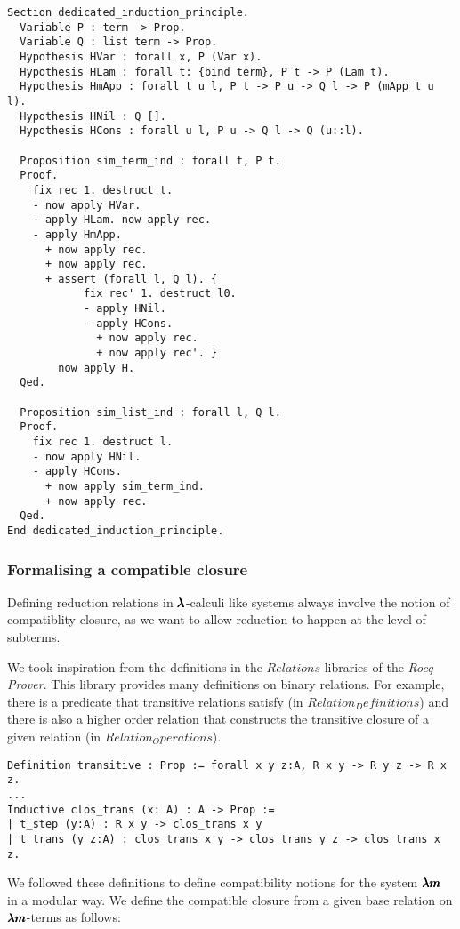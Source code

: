 \begin{lstlisting}[language=Coq]
Section dedicated_induction_principle.
  Variable P : term -> Prop.
  Variable Q : list term -> Prop.
  Hypothesis HVar : forall x, P (Var x).
  Hypothesis HLam : forall t: {bind term}, P t -> P (Lam t).
  Hypothesis HmApp : forall t u l, P t -> P u -> Q l -> P (mApp t u l).
  Hypothesis HNil : Q [].
  Hypothesis HCons : forall u l, P u -> Q l -> Q (u::l).
  
  Proposition sim_term_ind : forall t, P t.
  Proof.
    fix rec 1. destruct t.
    - now apply HVar.
    - apply HLam. now apply rec.
    - apply HmApp.
      + now apply rec.
      + now apply rec.
      + assert (forall l, Q l). {
            fix rec' 1. destruct l0.
            - apply HNil.
            - apply HCons.
              + now apply rec.
              + now apply rec'. }          
        now apply H.
  Qed.      
  
  Proposition sim_list_ind : forall l, Q l.
  Proof.
    fix rec 1. destruct l.
    - now apply HNil.
    - apply HCons.
      + now apply sim_term_ind.
      + now apply rec.
  Qed.          
End dedicated_induction_principle.
\end{lstlisting}

\subsubsection{Formalising a compatible closure}

Defining reduction relations in $\pmb{\lambda}$-calculi like systems always involve the notion of compatiblity closure, as we want to allow reduction to happen at the level of subterms.

We took inspiration from the definitions in the \lst$Relations$ libraries of the \textit{Rocq Prover}.
This library provides many definitions on binary relations.
For example, there is a predicate that transitive relations satisfy (in \lst$Relation_Definitions$) and there is also a higher order relation that constructs the transitive closure of a given relation (in \lst$Relation_Operations$).

\begin{lstlisting}[language=Coq]
Definition transitive : Prop := forall x y z:A, R x y -> R y z -> R x z.
...
Inductive clos_trans (x: A) : A -> Prop :=
| t_step (y:A) : R x y -> clos_trans x y
| t_trans (y z:A) : clos_trans x y -> clos_trans y z -> clos_trans x z.
\end{lstlisting}

We followed these definitions to define compatibility notions for the system $\pmb{\lambda m}$ in a modular way.
We define the compatible closure from a given base relation on $\pmb{\lambda m}$-terms as follows:

